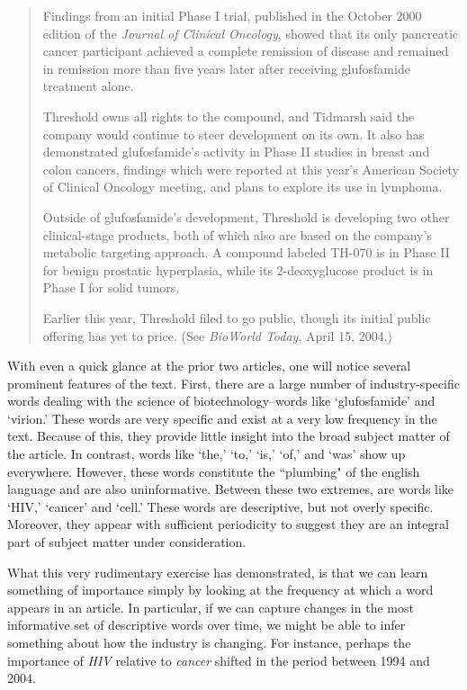 \begin{singlespace}
\begin{small}
\begin{quotation}
Findings from an initial Phase I trial, published in the October 2000 edition of the \emph{Journal of Clinical Oncology}, showed that its only pancreatic cancer participant achieved a complete remission of disease and remained in remission more than five years later after receiving glufosfamide treatment alone.

Threshold owns all rights to the compound, and Tidmarsh said the company would continue to steer development on its own. It also has demonstrated glufosfamide's activity in Phase II studies in breast and colon cancers, findings which were reported at this year's American Society of Clinical Oncology meeting, and plans to explore its use in lymphoma.

Outside of glufosfamide's development, Threshold is developing two other clinical-stage products, both of which also are based on the company's metabolic targeting approach. A compound labeled TH-070 is in Phase II for benign prostatic hyperplasia, while its 2-deoxyglucose product is in Phase I for solid tumors.

Earlier this year, Threshold filed to go public, though its initial public offering has yet to price. (See \emph{BioWorld Today}, April 15, 2004.) 
\end{quotation}
\end{small}
\end{singlespace}

With even a quick glance at the prior two articles, one will notice several prominent features of the text. First, there are a large number of industry-specific words dealing with the science of biotechnology--words like `glufosfamide' and `virion.' These words are very specific and exist at a very low frequency in the text. Because of this, they provide little insight into the broad subject matter of the article. In contrast, words like `the,' `to,' `is,' `of,' and `was' show up everywhere. However, these words constitute the ``plumbing" of the english language and are also uninformative. Between these two extremes, are words like `HIV,' `cancer' and `cell.' These words are descriptive, but not overly specific. Moreover, they appear with sufficient periodicity to suggest they are an integral part of subject matter under consideration. 

What this very rudimentary exercise has demonstrated, is that we can learn something of importance simply by looking at the frequency at which a word appears in an article. In particular, if we can capture changes in the most informative set of descriptive words over time, we might be able to infer something about how the industry is changing. For instance, perhaps the importance of \emph{HIV} relative to \emph{cancer} shifted in the period between 1994 and 2004.


